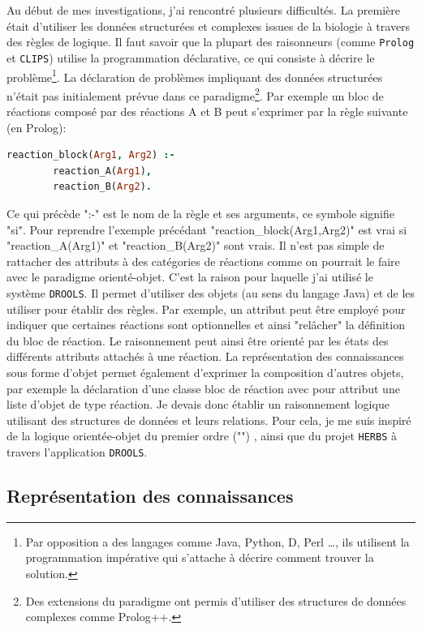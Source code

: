 \begin{refsegment}
Au début de mes investigations, j'ai rencontré plusieurs difficultés. La première était d'utiliser les données structurées et complexes issues de la biologie à travers des règles de logique. Il faut savoir que la plupart des raisonneurs (comme \texttt{Prolog} et \texttt{CLIPS}) utilise la programmation déclarative, ce qui consiste à décrire le problème\footnote{Par opposition a des langages comme Java, Python, D, Perl \ldots, ils utilisent la programmation impérative qui s'attache à décrire comment trouver la solution.}. La déclaration de problèmes impliquant des données structurées n'était pas initialement prévue dans ce paradigme\footnote{Des extensions du paradigme ont permis d'utiliser des structures de données complexes comme Prolog++.}. Par exemple un bloc de réactions composé par des réactions A et B peut s'exprimer par la règle suivante (en Prolog):

\begin{lstlisting}[basicstyle=\small\normalfont\ttfamily,language=Prolog]
    reaction_block(Arg1, Arg2) :-
        reaction_A(Arg1),
        reaction_B(Arg2).
\end{lstlisting}

Ce qui précède  ":-" est le nom de la règle et ses arguments, ce symbole signifie "si". Pour reprendre l'exemple précédant "reaction\_block(Arg1,Arg2)" est vrai si "reaction\_A(Arg1)" et "reaction\_B(Arg2)" sont vrais. Il n'est pas simple de rattacher des attributs à des catégories de réactions comme on pourrait le faire avec le paradigme orienté-objet. C'est la raison pour laquelle j'ai utilisé le système \texttt{DROOLS}. Il permet d'utiliser des objets (au sens du langage Java)  et de les utiliser pour établir des règles. Par exemple, un attribut peut être employé pour indiquer que certaines réactions sont optionnelles et ainsi "relâcher" la définition du bloc de réaction. Le raisonnement peut ainsi être orienté par les états des différents attributs attachés à une réaction. La représentation des connaissances sous forme d'objet permet également d'exprimer la composition d'autres objets, par exemple la déclaration d'une classe bloc de réaction avec pour attribut une liste d'objet de type réaction. Je devais donc établir un raisonnement logique utilisant des structures de données et leurs relations. Pour cela, je me suis inspiré de la logique orientée-objet du premier ordre ("") \cite{amir1999object}, ainsi que du projet \texttt{\gls{HERBS}} à travers l'application \texttt{DROOLS}.

\subsection{Représentation des connaissances}


\end{refsegment}

